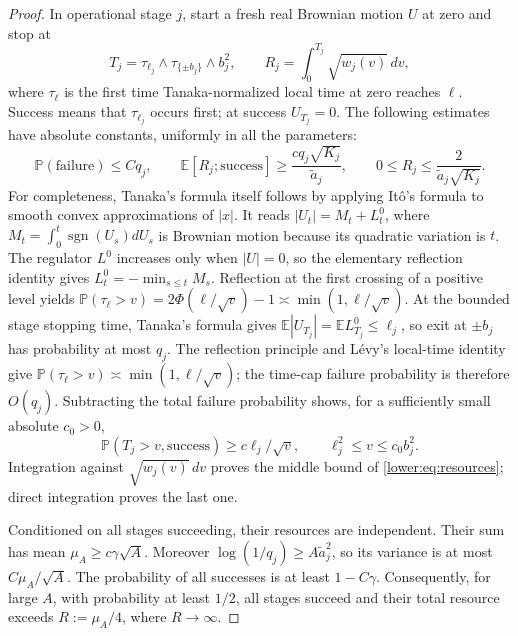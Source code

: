 \documentclass[11pt]{article}
\newcommand{\E}{\mathbb E}
\newcommand{\PP}{\mathbb P}
\numberwithin{equation}{section}
\begin{document}
\begin{proof}
In operational stage \(j\), start a fresh real Brownian motion
\(U\) at zero and stop at
\[
 T_j=\tau_{\ell_j}\wedge\tau_{\{\pm b_j\}}\wedge b_j^2,
 \qquad R_j=\int_0^{T_j}\sqrt{w_j(v)}\,dv,
\]
where \(\tau_\ell\) is the first time Tanaka-normalized local time
at zero reaches \(\ell\).  Success means that \(\tau_{\ell_j}\)
occurs first; at success \(U_{T_j}=0\).  The following estimates
have absolute constants, uniformly in all the parameters:
\[
 \PP(\text{failure})\le Cq_j,\qquad
 \E[R_j;\text{success}]\ge
       \frac{c q_j\sqrt{K_j}}{\widetilde a_j},\qquad
 0\le R_j\le\frac2{\widetilde a_j\sqrt{K_j}}.
 \tag{L5}\label{lower:eq:resources}
\]
For completeness, Tanaka's formula itself follows by applying It\^o's
formula to smooth convex approximations of $|x|$. It reads
$|U_t|=M_t+L_t^0$, where $M_t=\int_0^t\operatorname{sgn}(U_s)dU_s$
is Brownian motion because its quadratic variation is $t$. The regulator
$L^0$ increases only when $|U|=0$, so the elementary reflection
identity gives $L_t^0=-\min_{s\le t}M_s$. Reflection at the first
crossing of a positive level yields
$\PP(\tau_\ell>v)=2\Phi(\ell/\sqrt v)-1\asymp
\min(1,\ell/\sqrt v)$.
At the bounded stage stopping time, Tanaka's formula gives
\(\E|U_{T_j}|=\E L^0_{T_j}\le\ell_j\), so exit at
\(\pm b_j\) has probability at most \(q_j\).  The reflection
principle and L\'evy's local-time identity give
\(\PP(\tau_\ell>v)\asymp\min(1,\ell/\sqrt v)\); the time-cap
failure probability is therefore \(O(q_j)\).  Subtracting the total
failure probability shows, for a sufficiently small absolute
\(c_0>0\),
\[
 \PP(T_j>v,\text{success})\ge c\ell_j/\sqrt v,
 \qquad \ell_j^2\le v\le c_0b_j^2.
\]
Integration against \(\sqrt{w_j(v)}\,dv\) proves the middle
bound of \eqref{lower:eq:resources}; direct integration proves the
last one.

Conditioned on all stages succeeding, their resources are independent.
Their sum has mean \(\mu_A\ge c\gamma\sqrt A\).  Moreover
\(\log(1/q_j)\ge A\widetilde a_j^2\), so its variance is at most
\(C\mu_A/\sqrt A\).  The probability of all successes is at least
\(1-C\gamma\).  Consequently, for large \(A\), with probability
at least \(1/2\), all stages succeed and their total resource exceeds
\(R:=\mu_A/4\), where \(R\to\infty\).


\end{proof}
\end{document}
